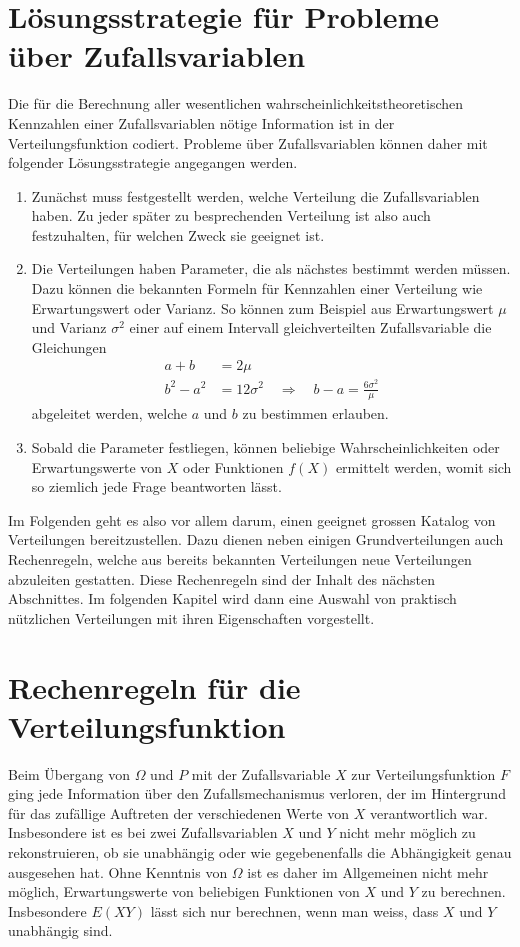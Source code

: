 \section{Lösungsstrategie für Probleme über Zufallsvariablen}
Die für die Berechnung aller wesentlichen wahrscheinlichkeitstheoretischen
Kennzahlen einer Zufallsvariablen nötige Information ist in der
Verteilungsfunktion codiert.
Probleme über Zufallsvariablen können daher mit folgender Lösungsstrategie
angegangen werden.
\begin{enumerate}
\item
Zunächst muss festgestellt werden, welche Verteilung die Zufallsvariablen
haben.
Zu jeder später zu besprechenden Verteilung ist also auch
festzuhalten, für welchen Zweck sie geeignet ist.
\item 
Die Verteilungen haben Parameter, die als nächstes bestimmt werden
müssen.
Dazu können die bekannten Formeln für Kennzahlen einer
Verteilung wie Erwartungswert oder Varianz.
So können zum Beispiel aus Erwartungswert $\mu$ und Varianz $\sigma^2$ 
einer auf einem Intervall gleichverteilten Zufallsvariable  die
Gleichungen
\begin{align*}
a+b&=2\mu\\
b^2-a^2&=12\sigma^2\quad\Rightarrow\quad b-a=\frac{6\sigma^2}{\mu}
\end{align*}
abgeleitet werden, welche $a$ und $b$ zu bestimmen erlauben.
\item
Sobald die Parameter festliegen, können beliebige Wahrscheinlichkeiten
oder Erwartungswerte von $X$ oder Funktionen $f(X)$ ermittelt werden,
womit sich so ziemlich jede Frage beantworten lässt.
\end{enumerate}
Im Folgenden geht es also vor allem darum, einen geeignet grossen
Katalog von Verteilungen bereitzustellen.
Dazu dienen neben einigen
Grundverteilungen auch Rechenregeln, welche aus bereits bekannten
Verteilungen neue Verteilungen abzuleiten gestatten.
Diese Rechenregeln
sind der Inhalt des nächsten Abschnittes.
Im folgenden Kapitel wird
dann eine Auswahl von praktisch nützlichen Verteilungen mit ihren
Eigenschaften vorgestellt.

\section{Rechenregeln für die Verteilungsfunktion}
Beim Übergang von $\Omega$ und $P$ mit
der Zufallsvariable $X$ zur Verteilungsfunktion $F$ 
ging jede Information
über den Zufallsmechanismus verloren, der im Hintergrund für das zufällige
Auftreten der verschiedenen Werte von $X$ verantwortlich war.
Insbesondere
ist es bei zwei Zufallsvariablen $X$ und $Y$ nicht mehr möglich zu
rekonstruieren, ob sie unabhängig oder wie gegebenenfalls die Abhängigkeit
genau ausgesehen hat.
Ohne Kenntnis von $\Omega$ ist es daher im Allgemeinen
nicht mehr möglich, Erwartungswerte von beliebigen Funktionen von $X$ und $Y$
zu berechnen.
Insbesondere $E(XY)$ lässt sich nur berechnen, wenn man weiss,
dass $X$ und $Y$ unabhängig sind.

